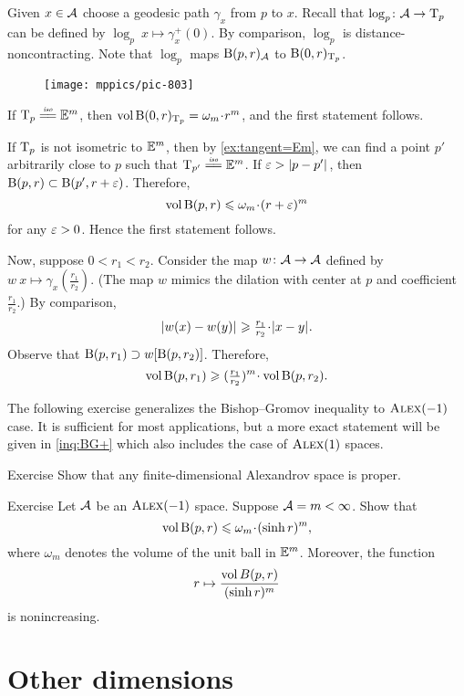 Given $x\in\mathcal{A}$ choose a geodesic path $\gamma_x$ from $p$ to $x$.
Recall that $\log_p\colon\mathcal{A}\to \mathrm{T}_p$ can be defined by $\log_p\:x\mapsto \gamma_x^+(0)$.
By comparison, $\log_p$ is distance-noncontracting.
Note that $\log_p$ maps $\mathrm{B}{}(p,r)_{\mathcal{A}}$ to $\mathrm{B}{}(0,r)_{\mathrm{T}_p}$.

\begin{wrapfigure}{r}{44 mm}
\vskip-0mm
\centering
\texttt{[image: mppics/pic-803]}
\vskip1mm
\end{wrapfigure}

If $\T_p\iso \EE^m$, then $\vol\oBall(0,r)_{\T_p}\z=\omega_m\cdot r^m$,
and the first statement follows.

If $\mathrm{T}_p$ is not isometric to $\mathbb{E}^m$, then by \ref{ex:tangent=Em}, we can find a point $p'$ arbitrarily close to $p$ such that $\T_{p'}\iso \EE^m$.
If $\varepsilon>|{p}-{p'}|_{}^{{}}$, then $\mathrm{B}{}(p,r)\subset \mathrm{B}{}(p',r+\varepsilon)$.
Therefore,
\[\vol \oBall(p,r)\le \omega_m\cdot (r+\eps)^m\]
for any $\varepsilon>0$.
Hence the first statement follows.

Now, suppose $0<r_1<r_2$.
Consider the map $w\colon \mathcal{A}\to \mathcal{A}$ defined by $w\:x\mapsto \gamma_x(\tfrac {r_1}{r_2})$.
(The map $w$ mimics the dilation with center at $p$ and coefficient $\tfrac {r_1}{r_2}$.)
By comparison,
\[\dist{w(x)}{w(y)}{}\ge \tfrac {r_1}{r_2}\cdot \dist{x}{y}{}.\]
Observe that $\mathrm{B}{}(p,r_1) \supset w[\mathrm{B}{}(p,r_2)]$.
Therefore, 
\[\vol \oBall(p,r_1)\ge (\tfrac {r_1}{r_2})^m\cdot\vol \oBall(p,r_2).\]
\qedsf

The following exercise generalizes the Bishop--Gromov inequality to $\textsc{Alex}(-1)$ case. 
It is sufficient for most applications, but a more exact statement will be given in \ref{inq:BG+} which also includes the case of  $\textsc{Alex}(1)$ spaces.

\begin{thm}{Exercise}\label{ex:diam-compact:proper}
Show that any finite-dimensional Alexandrov space is proper.

\end{thm}

\begin{thm}{Exercise}\label{ex:BG}
Let $\mathcal{A}$ be an $\textsc{Alex}(-1)$ space.
Suppose $\mathcal{A}=m<\infty$.
Show that
\[\vol \oBall(p,r)\le \omega_m\cdot(\sinh r)^m,\]
where $\omega_m$ denotes the volume of the unit ball in $\mathbb{E}^m$.
Moreover, the function 
\[r\mapsto \frac{\operatorname{\rm vol}\nolimits B(p,r)}{(\sinh r)^m}\]
is nonincreasing.
\end{thm}

\section{Other dimensions}\label{sec:all-dim}

